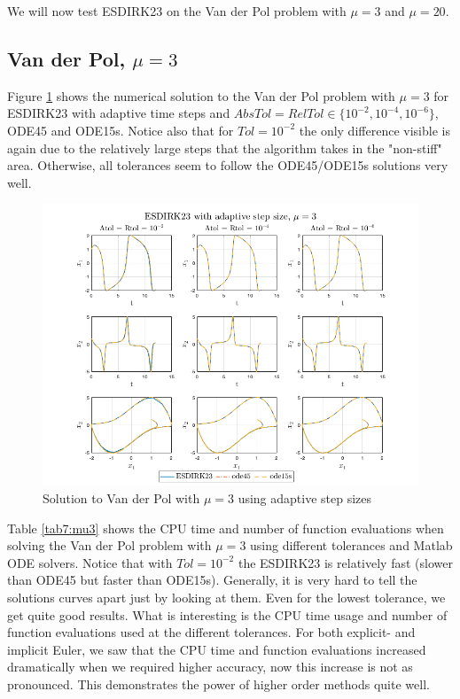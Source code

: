 We will now test ESDIRK23 on the Van der Pol problem with $\mu = 3$ and $\mu = 20$. 

\subsection{Van der Pol, $\mu = 3$}
Figure \ref{fig7:mu3} shows the numerical solution to the Van der Pol problem with $\mu = 3$ for ESDIRK23 with adaptive time steps and $AbsTol=RelTol \in \{10^{-2}, 10^{-4}, 10^{-6}\}$, ODE45 and ODE15s. Notice also that for $Tol = 10^{-2}$ the only difference visible is again due to the relatively large steps that the algorithm takes in the "non-stiff" area. Otherwise, all tolerances seem to follow the ODE45/ODE15s solutions very well.

\begin{figure}[H]
    \centering
    \includegraphics[width=\textwidth]{graphics/opg7/mu3.png}
    \caption{Solution to Van der Pol with $\mu = 3$ using adaptive step sizes}
    \label{fig7:mu3}
\end{figure}

Table \ref{tab7:mu3} shows the CPU time and number of function evaluations when solving the Van der Pol problem with $\mu = 3$ using different tolerances and Matlab ODE solvers. Notice that with $Tol = 10^{-2}$ the ESDIRK23 is relatively fast (slower than ODE45 but faster than ODE15s). Generally, it is very hard to tell the solutions curves apart just by looking at them. Even for the lowest tolerance, we get quite good results. What is interesting is the CPU time usage and number of function evaluations used at the different tolerances. For both explicit- and implicit Euler, we saw that the CPU time and function evaluations increased dramatically when we required higher accuracy, now this increase is not as pronounced. This demonstrates the power of higher order methods quite well.

